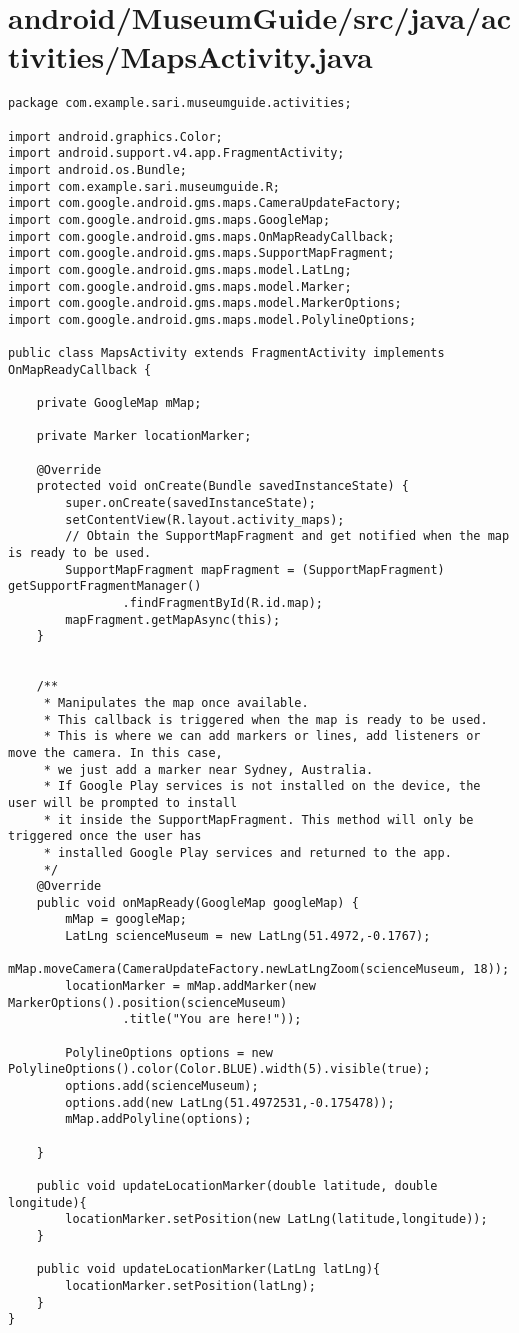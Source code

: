 \section{android/MuseumGuide/src/java/activities/MapsActivity.java}
\begin{lstlisting}package com.example.sari.museumguide.activities;

import android.graphics.Color;
import android.support.v4.app.FragmentActivity;
import android.os.Bundle;
import com.example.sari.museumguide.R;
import com.google.android.gms.maps.CameraUpdateFactory;
import com.google.android.gms.maps.GoogleMap;
import com.google.android.gms.maps.OnMapReadyCallback;
import com.google.android.gms.maps.SupportMapFragment;
import com.google.android.gms.maps.model.LatLng;
import com.google.android.gms.maps.model.Marker;
import com.google.android.gms.maps.model.MarkerOptions;
import com.google.android.gms.maps.model.PolylineOptions;

public class MapsActivity extends FragmentActivity implements OnMapReadyCallback {

    private GoogleMap mMap;

    private Marker locationMarker;

    @Override
    protected void onCreate(Bundle savedInstanceState) {
        super.onCreate(savedInstanceState);
        setContentView(R.layout.activity_maps);
        // Obtain the SupportMapFragment and get notified when the map is ready to be used.
        SupportMapFragment mapFragment = (SupportMapFragment) getSupportFragmentManager()
                .findFragmentById(R.id.map);
        mapFragment.getMapAsync(this);
    }


    /**
     * Manipulates the map once available.
     * This callback is triggered when the map is ready to be used.
     * This is where we can add markers or lines, add listeners or move the camera. In this case,
     * we just add a marker near Sydney, Australia.
     * If Google Play services is not installed on the device, the user will be prompted to install
     * it inside the SupportMapFragment. This method will only be triggered once the user has
     * installed Google Play services and returned to the app.
     */
    @Override
    public void onMapReady(GoogleMap googleMap) {
        mMap = googleMap;
        LatLng scienceMuseum = new LatLng(51.4972,-0.1767);
        mMap.moveCamera(CameraUpdateFactory.newLatLngZoom(scienceMuseum, 18));
        locationMarker = mMap.addMarker(new MarkerOptions().position(scienceMuseum)
                .title("You are here!"));

        PolylineOptions options = new PolylineOptions().color(Color.BLUE).width(5).visible(true);
        options.add(scienceMuseum);
        options.add(new LatLng(51.4972531,-0.175478));
        mMap.addPolyline(options);

    }

    public void updateLocationMarker(double latitude, double longitude){
        locationMarker.setPosition(new LatLng(latitude,longitude));
    }

    public void updateLocationMarker(LatLng latLng){
        locationMarker.setPosition(latLng);
    }
}
\end{lstlisting}
\newpage
